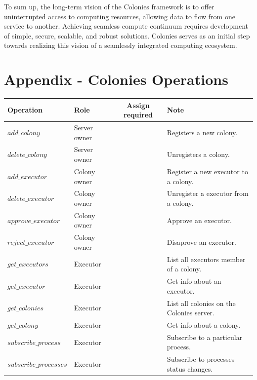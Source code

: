 \documentclass{article}
\begin{document}
To sum up, the long-term vision of the Colonies framework is to offer uninterrupted access to computing resources, allowing data to flow from one service to another. Achieving seamless compute continuum requires development of simple, secure, scalable, and robust solutions. Colonies serves as an initial step towards realizing this vision of a seamlessly integrated computing ecosystem.


 

\newpage
\appendix
\section{Appendix - Colonies Operations}
\begin{table}[h]
	\centering
	\begin{tabular}{llcl}
		\toprule
		\cmidrule(r){1-4}
        Operation                  & Role         & Assign required & Note \\
		\midrule
        \(add\_colony\)            & Server owner &            & Registers a new colony. \\
        \(delete\_colony\)         & Server owner &            & Unregisters a colony. \\
        \(add\_executor\)          & Colony owner &            & Register a new executor to a colony. \\
        \(delete\_executor\)       & Colony owner &            & Unregister a executor from a colony. \\
        \(approve\_executor\)      & Colony owner &            & Approve an executor. \\
        \(reject\_executor\)       & Colony owner &            & Disaprove an executor. \\
        \(get\_executors\)         & Executor     &            & List all executors member of a colony. \\
        \(get\_executor\)          & Executor     &            & Get info about an executor. \\
        \(get\_colonies\)          & Executor     &            & List all colonies on the Colonies server. \\
        \(get\_colony\)            & Executor     &            & Get info about a colony. \\
        \(subscribe\_process\)     & Executor     &            & Subscribe to a particular process. \\
        \(subscribe\_processes\)   & Executor     &            & Subscribe to processes status changes. \\

\end{tabular}
\end{table}
\end{document}
